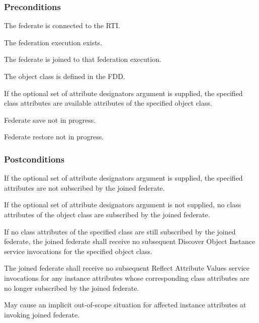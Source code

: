 \clearpage

\begin{compactstdpage}
    \subsubsection{Preconditions}
    \begin{stdalphalist}
        \item The federate is connected to the RTI.
        \item The federation execution exists.
        \item The federate is joined to that federation execution.
        \item The object class is defined in the FDD.
        \item If the optional set of attribute designators argument is supplied, the specified class attributes are available attributes of the specified object class.
        \item Federate save not in progress.
        \item Federate restore not in progress.
    \end{stdalphalist}

    \subsubsection{Postconditions}
    \begin{stdalphalist}
        \item If the optional set of attribute designators argument is supplied, the specified attributes are not subscribed by the joined federate.
        \item If the optional set of attribute designators argument is not supplied, no class attributes of the object class are subscribed by the joined federate.
        \item If no class attributes of the specified class are still subscribed by the joined federate, the joined federate shall receive no subsequent Discover Object Instance service invocations for the specified object class.
        \item The joined federate shall receive no subsequent Reflect Attribute Values \rtiinitiated{} service invocations for any instance attributes whose corresponding class attributes are no longer subscribed by the joined federate.
        \item May cause an implicit out-of-scope situation for affected instance attributes at invoking joined federate.
    \end{stdalphalist}


\end{compactstdpage}
